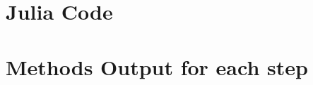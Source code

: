 \documentclass[12pt, onside]{article}
\begin{document}
\newpage

\begin{appendices}

\section{Julia Code}







\section{Methods Output for each step}









\end{appendices}
\end{document}
